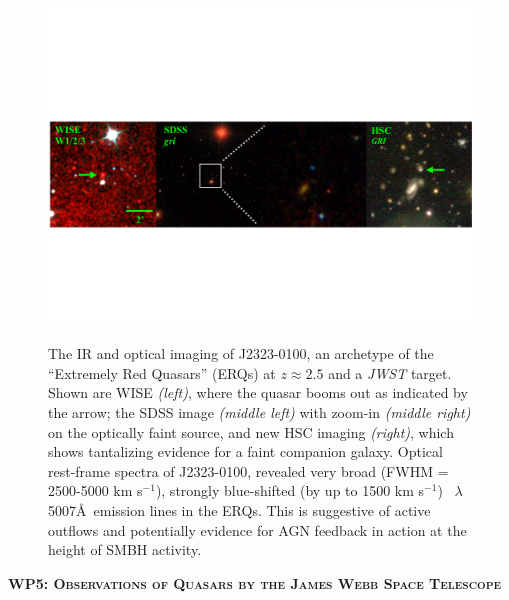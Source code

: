 \begin{figure}[h]
  \begin{center}
    \includegraphics[width=17.0cm, trim={0.15cm 0 0.05cm 0},clip]
   {figures/WISE_SDSSzoomHSC_ERQ-image_v3.pdf}
    \vspace{-20pt}
   \caption{%
\footnotesize 
The IR and optical imaging of J2323-0100, an archetype of the
``Extremely Red Quasars'' (ERQs) at $z\approx2.5$ and a {\it JWST}
target. Shown are WISE {\it (left)}, where the quasar booms out as
indicated by the arrow; the SDSS image {\it (middle left)} with
zoom-in {\it (middle right)} on the optically faint source, and new
HSC imaging {\it (right)}, which shows tantalizing evidence for a
faint companion galaxy. Optical rest-frame spectra of J2323-0100,
revealed very broad (FWHM = 2500-5000 km s$^{-1}$), strongly
blue-shifted (by up to 1500 km s$^{-1}$) \oiii\ $\lambda$5007\AA\
emission lines in the ERQs. This is suggestive of active outflows and
potentially evidence for AGN feedback in action at the height of SMBH
activity.
}
  \vspace{-12pt}
 \label{fig:ERQ}
\end{center}
\end{figure}

\medskip
\medskip
\smallskip
\smallskip
\noindent
\textbf{\textsc{WP5: Observations of Quasars by the James Webb Space Telescope}} 

